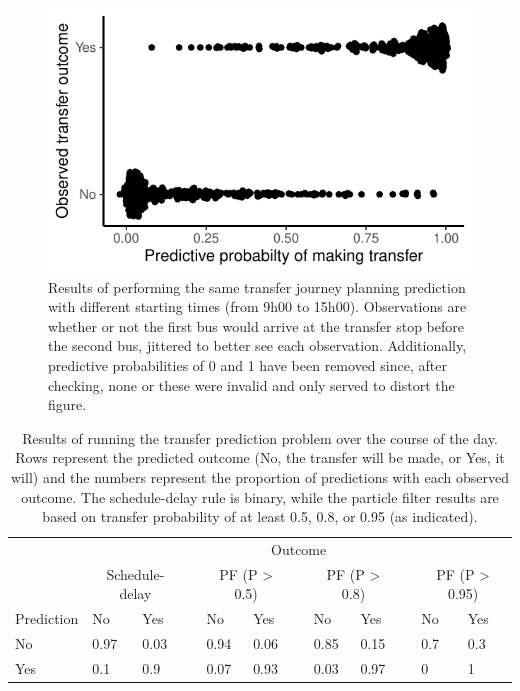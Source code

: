 \begin{knitrout}\small
{}\color{fgcolor}\begin{figure}

{\centering \includegraphics[width=.5\textwidth]{figure/eta_journey_transfer_many-1} 

}

\caption[Results of performing the same transfer journey planning prediction with different starting times (from  9h00 to 15h00)]{Results of performing the same transfer journey planning prediction with different starting times (from  9h00 to 15h00). Observations are whether or not the first bus would arrive at the transfer stop before the second bus, jittered to better see each observation. Additionally, predictive probabilities of 0 and 1 have been removed since, after checking, none or these were invalid and only served to distort the figure.}\label{fig:eta_journey_transfer_many}
\end{figure}

\begin{table}

\caption{\label{tab:eta_journey_transfer_many}Results of running the transfer prediction problem over the course of the day. Rows represent the predicted outcome (No, the transfer will be made, or Yes, it will) and the numbers represent the proportion of predictions with each observed outcome. The schedule-delay rule is binary, while the particle filter results are based on transfer probability of at least 0.5, 0.8, or 0.95 (as indicated).}
\centering
\fontsize{8}{10}\selectfont
\begin{tabular}[t]{llllllllllll}
\toprule
\multicolumn{1}{c}{} & \multicolumn{11}{c}{Outcome} \\
\cmidrule(l{3pt}r{3pt}){2-12}
\multicolumn{1}{c}{} & \multicolumn{2}{c}{Schedule-delay} & \multicolumn{1}{c}{} & \multicolumn{2}{c}{PF (P > 0.5)} & \multicolumn{1}{c}{} & \multicolumn{2}{c}{PF (P > 0.8)} & \multicolumn{1}{c}{} & \multicolumn{2}{c}{PF (P > 0.95)} \\
\cmidrule(l{3pt}r{3pt}){2-3} \cmidrule(l{3pt}r{3pt}){5-6} \cmidrule(l{3pt}r{3pt}){8-9} \cmidrule(l{3pt}r{3pt}){11-12}
Prediction & No & Yes &  & No & Yes &  & No & Yes &  & No & Yes\\
\midrule
No & 0.97 & 0.03 &  & 0.94 & 0.06 &  & 0.85 & 0.15 &  & 0.7 & 0.3\\
Yes & 0.1 & 0.9 &  & 0.07 & 0.93 &  & 0.03 & 0.97 &  & 0 & 1\\
\bottomrule
\end{tabular}
\end{table}


\end{knitrout}



